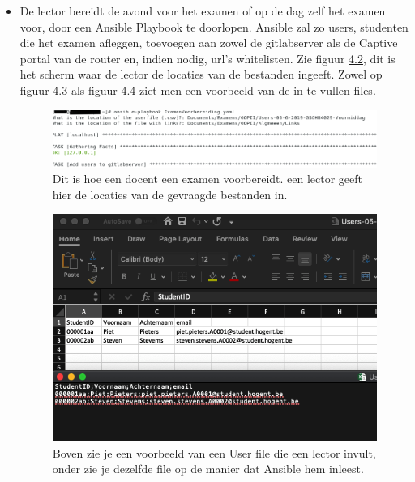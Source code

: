 \begin{itemize}
	\item De lector bereidt de avond voor het examen of op de dag zelf het examen voor, door een Ansible Playbook te doorlopen. Ansible zal zo users, studenten die het examen afleggen, toevoegen aan zowel de gitlabserver als de Captive portal van de router en, indien nodig, url's whitelisten. Zie figuur \hyperref[fig:PoC2]{4.2}, dit is het scherm waar de lector de locaties van de bestanden ingeeft. Zowel op figuur \hyperref[fig:PoC3]{4.3} als figuur \hyperref[fig:PoC4]{4.4} ziet men een voorbeeld van de in te vullen files. 

	\begin{figure}[H]
		\includegraphics[width=\linewidth]{img/AdminPC.png}
		\caption[Voorbeeld van het Ansible Playbook]{Dit is hoe een docent een examen voorbereidt. een lector geeft hier de locaties van de gevraagde bestanden in.}
		\label{fig:PoC2}
	\end{figure}
	
	\begin{figure}[H]
	\includegraphics[width=\linewidth]{img/CSV1.png}
	\caption[Voorbeeld van Users.csv]{Boven zie je een voorbeeld van een User file die een lector invult, onder zie je dezelfde file op de manier dat Ansible hem inleest.}
	\label{fig:PoC3}
\end{figure}


\end{itemize}
